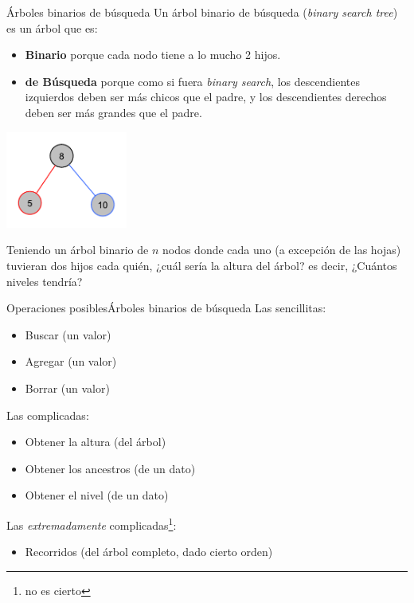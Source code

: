 \documentclass[usenames, dvipsnames, spanish, c]{beamer}
\begin{document}
\begin{frame}{Árboles binarios de búsqueda}
Un \alert{árbol binario de búsqueda} (\textit{binary search tree}) es un árbol que es:

\begin{itemize}
    \itemsep3.5ex
    \item \textbf{Binario} porque cada nodo tiene a lo mucho \alert{2} hijos.
    \item \textbf{de Búsqueda} porque como si fuera \textit{binary search}, los descendientes \alert{izquierdos} deben ser \alert{más chicos} que el padre, y los descendientes {\color{blue} derechos} deben ser {\color{blue} más grandes} que el padre.
\end{itemize}

\begin{center}
    \includegraphics[width=0.3\textwidth]{basecase.pdf}
\end{center}
\end{frame}

\begin{frame}[plain]
    \begin{center}
        \huge
        Teniendo un árbol binario de $n$ nodos donde cada uno (a excepción de las hojas) tuvieran dos hijos cada quién, ¿cuál sería la altura del árbol? es decir, ¿Cuántos niveles tendría?
    \end{center}
\end{frame}

\begin{frame}{Operaciones posibles}{Árboles binarios de búsqueda}
    Las sencillitas:
    \begin{itemize}
        \item Buscar (un valor)
        \item Agregar (un valor)
        \item Borrar (un valor)
    \end{itemize} \pause

    \bigskip

    Las complicadas:
    \begin{itemize}
        \item Obtener la altura (del árbol)
        \item Obtener los ancestros (de un dato)
        \item Obtener el nivel (de un dato)
    \end{itemize} \pause

    \bigskip

    Las \textit{extremadamente} complicadas\footnote{\scriptsize no es cierto}:
    \begin{itemize}
        \item Recorridos (del árbol completo, dado cierto orden)
    \end{itemize}
\end{frame}
\end{document}
